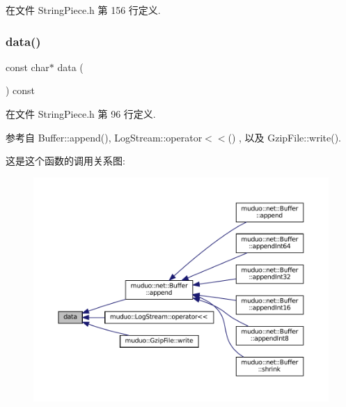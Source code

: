 在文件 String\+Piece.\+h 第 156 行定义.

\mbox{\label{classmuduo_1_1StringPiece_a39a256207a84f316547e36c755373d03}} 
\subsubsection{\texorpdfstring{data()}{data()}}
{\footnotesize\ttfamily const char$\ast$ data (\begin{DoxyParamCaption}{ }\end{DoxyParamCaption}) const\hspace{0.3cm}{\ttfamily [inline]}}



在文件 String\+Piece.\+h 第 96 行定义.



参考自 Buffer\+::append(), Log\+Stream\+::operator$<$$<$() , 以及 Gzip\+File\+::write().

这是这个函数的调用关系图\+:
\nopagebreak
\begin{figure}[H]
\begin{center}
\leavevmode
\includegraphics[width=350pt]{classmuduo_1_1StringPiece_a39a256207a84f316547e36c755373d03_icgraph}
\end{center}
\end{figure}
\mbox{\label{classmuduo_1_1StringPiece_a644718bb2fb240de962dc3c9a1fdf0dc}} 

